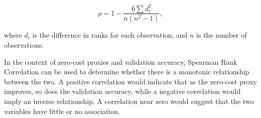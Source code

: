 \begin{equation} 
\rho = 1 - \frac{6 \sum d_i^2}{n(n^2 - 1)}, 
 \end{equation}

where $d_i$ is the difference in ranks for each observation, and $n$ is the number of observations.

In the context of zero-cost proxies and validation accuracy, Spearman Rank Correlation can be used to determine whether there is a monotonic relationship between the two. A positive correlation would indicate that as the zero-cost proxy improves, so does the validation accuracy, while a negative correlation would imply an inverse relationship. A correlation near zero would suggest that the two variables have little or no association. 



